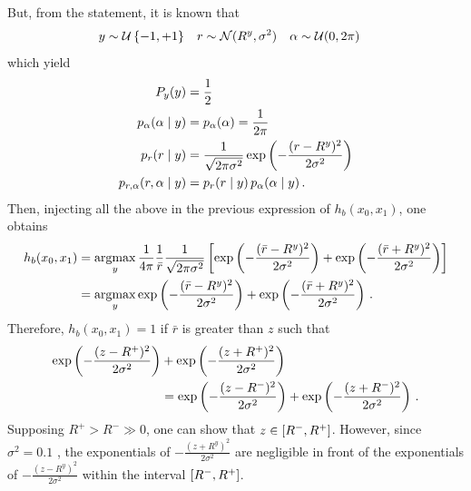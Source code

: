 \documentclass[a4paper, 12pt]{article}
\DeclareMathOperator{\argmax}{argmax}
\begin{document}
\begin{enumerate}[label = (\alph*)]
    	But, from the statement, it is known that
    	\begin{align*}
    	    y & \sim \mathcal{U}\left\{-1,+1\right\} & r & \sim \mathcal{N}(R^y, \sigma^2) & \alpha & \sim \mathcal{U}(0, 2 \pi)
    	\end{align*}
    	which yield
    	\begin{align*}
    	    P_y(y) & = \frac{1}{2} \\
    	    p_\alpha(\alpha \mid y) & = p_\alpha(\alpha) = \frac{1}{2\pi} \\
    	    p_r(r \mid y) & = \frac{1}{\sqrt{2 \pi \sigma^2}} \exp\left(-\frac{(r - R^y)^2}{2 \sigma ^2}\right) \\
    	    p_{r, \alpha}(r, \alpha \mid y) & =  p_{r}(r \mid y) \, p_{\alpha}(\alpha \mid y) \, .
    	\end{align*}
    	Then, injecting all the above in the previous expression of $h_b(x_0, x_1)$, one obtains
    	\begin{align*}
    	    h_b(x_0, x_1) & = \argmax_y \frac{1}{4 \pi} \frac{1}{\bar{r}} \frac{1}{\sqrt{2 \pi \sigma^2}} \sbk{\exp\rbk{-\frac{(\bar{r} - R^y)^2}{2 \sigma ^2}} + \exp\rbk{-\frac{(\bar{r} + R^y)^2}{2 \sigma ^2}}} \\
    	    & = \argmax_y \exp\rbk{-\frac{(\bar{r} - R^y)^2}{2 \sigma ^2}} + \exp\rbk{-\frac{(\bar{r} + R^y)^2}{2 \sigma ^2}} \, .
    	\end{align*}
    	Therefore, $h_b(x_0, x_1) = 1$ if $\bar{r}$ is greater than $z$ such that
    	\begin{align*}
    	    \exp\left(-\frac{(z - R^+)^2}{2 \sigma ^2}\right) & + \exp\left(-\frac{(z + R^+)^2}{2 \sigma ^2}\right) \\
    	    & = \exp\left(-\frac{(z - R^-)^2}{2 \sigma ^2}\right) + \exp\left(-\frac{(z + R^-)^2}{2 \sigma ^2}\right) \, .
    	\end{align*}
    	Supposing $R^+ > R^- \gg 0$, one can show that $z \in \left[R^-, R^+\right]$. However, since $\sigma^2 = \num{0.1}$ , the exponentials of
    	$-\frac{(z + R^y)^2}{2 \sigma ^2}$ are negligible in front of the exponentials of $-\frac{(z - R^y)^2}{2 \sigma ^2}$ within the interval $\left[R^-, R^+\right]$.
    	

\end{enumerate}
\end{document}
